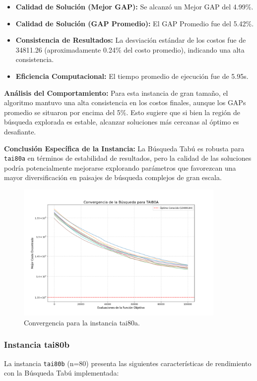 \documentclass[12pt, a4paper]{article}
\begin{document}
\begin{itemize}
    \item \textbf{Calidad de Solución (Mejor GAP):} Se alcanzó un Mejor GAP del 4.99\%.
    \item \textbf{Calidad de Solución (GAP Promedio):} El GAP Promedio fue del 5.42\%.
    \item \textbf{Consistencia de Resultados:} La desviación estándar de los costos fue de 34811.26 (aproximadamente 0.24\% del costo promedio), indicando una alta consistencia.
    \item \textbf{Eficiencia Computacional:} El tiempo promedio de ejecución fue de 5.95s.
\end{itemize}

\textbf{Análisis del Comportamiento:}
Para esta instancia de gran tamaño, el algoritmo mantuvo una alta consistencia en los costos finales, aunque los GAPs promedio se situaron por encima del 5\%. Esto sugiere que si bien la región de búsqueda explorada es estable, alcanzar soluciones más cercanas al óptimo es desafiante.

\textbf{Conclusión Específica de la Instancia:}
La Búsqueda Tabú es robusta para \texttt{tai80a} en términos de estabilidad de resultados, pero la calidad de las soluciones podría potencialmente mejorarse explorando parámetros que favorezcan una mayor diversificación en paisajes de búsqueda complejos de gran escala.
\begin{figure}[H]
\centering
\includegraphics[width=0.9\textwidth]{../results/graphs/tai80a_convergence.png}
\caption{Convergencia para la instancia tai80a.}
\label{fig:tai80a_conv}
\end{figure}

\newpage
\subsubsection{Instancia tai80b}
La instancia \texttt{tai80b} (n=80) presenta las siguientes características de rendimiento con la Búsqueda Tabú implementada:
\end{document}
